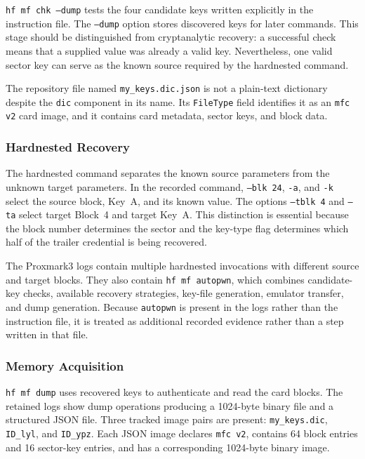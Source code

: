\documentclass[sigconf]{acmart}
\begin{document}
\texttt{hf mf chk --dump} tests the four candidate keys written explicitly in the instruction file. The \texttt{--dump} option stores discovered keys for later commands. This stage should be distinguished from cryptanalytic recovery: a successful check means that a supplied value was already a valid key. Nevertheless, one valid sector key can serve as the known source required by the hardnested command.

The repository file named \texttt{my\_keys.dic.json} is not a plain-text dictionary despite the \texttt{dic} component in its name. Its \texttt{FileType} field identifies it as an \texttt{mfc v2} card image, and it contains card metadata, sector keys, and block data.

\subsubsection{Hardnested Recovery}

The hardnested command separates the known source parameters from the unknown target parameters. In the recorded command, \texttt{--blk 24}, \texttt{-a}, and \texttt{-k} select the source block, Key~A, and its known value. The options \texttt{--tblk 4} and \texttt{--ta} select target Block~4 and target Key~A. This distinction is essential because the block number determines the sector and the key-type flag determines which half of the trailer credential is being recovered.

The Proxmark3 logs contain multiple hardnested invocations with different source and target blocks. They also contain \texttt{hf mf autopwn}, which combines candidate-key checks, available recovery strategies, key-file generation, emulator transfer, and dump generation. Because \texttt{autopwn} is present in the logs rather than the instruction file, it is treated as additional recorded evidence rather than a step written in that file.

\subsubsection{Memory Acquisition}

\texttt{hf mf dump} uses recovered keys to authenticate and read the card blocks. The retained logs show dump operations producing a 1024-byte binary file and a structured JSON file. Three tracked image pairs are present: \texttt{my\_keys.dic}, \texttt{ID\_lyl}, and \texttt{ID\_ypz}. Each JSON image declares \texttt{mfc v2}, contains 64 block entries and 16 sector-key entries, and has a corresponding 1024-byte binary image.
\end{document}
